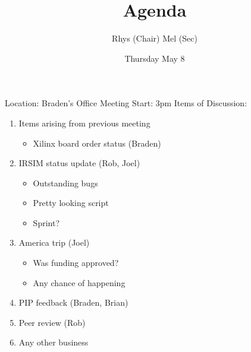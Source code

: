 \documentclass{article}
\begin{document}
  \author{Rhys (Chair) Mel (Sec)}
  \title{Agenda}
  \date{Thursday May 8}
  \maketitle
\begin{flushleft}
Location: Braden's Office 
\newline
Meeting Start: 3pm
\newline
\newline
Items of Discussion:

\begin{enumerate}

  \item Items arising from previous meeting 
    \begin{itemize}
    \item Xilinx board order status (Braden)
  \end{itemize}

  \item IRSIM status update (Rob, Joel)
    \begin{itemize}
      \item Outstanding bugs
      \item Pretty looking script
      \item Sprint?
  \end{itemize}


  \item America trip (Joel) 
    \begin{itemize}
	  \item Was funding approved?
	  \item Any chance of happening
  \end{itemize}
  
  \item PIP feedback (Braden, Brian) 

  \item Peer review (Rob)
  
  \item Any other business

\end{enumerate}
\end{flushleft}
\end{document}
